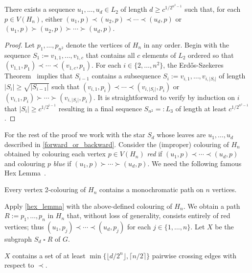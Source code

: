 \documentclass[kpfonts]{patmorin}
\renewcommand{\ge}{\geqslant}
\newcommand{\CartProd}{\mathbin{\square}}
\begin{document}
\begin{lem}\label{forward_or_backward}
    There exists a sequence $u_1,\ldots,u_{d}\in L_2$ of length $d\ge c^{1/2^{n^2-1}}$ such that, for each $p\in V(H_n)$, either  $(u_1,p)\prec (u_2,p)\prec\cdots\prec (u_{d},p)$ or $(u_1,p)\succ (u_2,p)\succ\cdots\succ (u_{d},p)$.
\end{lem}

\begin{proof}
    Let $p_1,\ldots,p_{n^2}$ denote the vertices of $H_n$ in any order.
    Begin with the sequence $S_1:=v_{1,1},\ldots,v_{1,c}$ that contains all $c$ elements of $L_2$ ordered so that $(v_{1,1},p_1)\prec\cdots\prec(v_{1,c},p_1)$.  For each $i\in\{2,\ldots,n^2\}$, the Erd\H{o}s-Szekeres Theorem~\citep{ES35} implies that $S_{i-1}$ contains a subsequence $S_i:=v_{i,1},\ldots,v_{i,|S_i|}$ of length $|S_i|\ge \sqrt{|S_{i-1}|}$ such that $(v_{i,1},p_i)\prec\cdots\prec(v_{i,|S_i|},p_i)$ or $(v_{i,1},p_i)\succ\cdots\succ(v_{i,|S_i|},p_i)$.  It is straightforward to verify by induction on $i$ that $|S_i| \ge c^{1/2^{i-1}}$ resulting in a final sequence $S_{n^2}=:L_3$ of length at least $c^{1/2^{n^2-1}}$.
\end{proof}


For the rest of the proof we work with the star $S_d$ whose leaves are $u_1,\ldots,u_d$ described in \cref{forward_or_backward}.  Consider the (improper) colouring of $H_n$ obtained by colouring each vertex $p\in V(H_n)$ \emph{red} if $(u_1,p)\prec\cdots\prec (u_d,p)$ and colouring $p$ \emph{blue} if $(u_1,p)\succ\cdots\succ(u_d,p)$. We need the following famous Hex Lemma~\citep{Gale79}.

\begin{lem} \label{hex_lemma}
Every vertex 2-colouring of $H_n$ contains a monochromatic path on $n$ vertices.
\end{lem}

Apply \cref{hex_lemma} with the above-defined colouring of $H_n$. We obtain a path $R:=p_1,\ldots,p_n$ in $H_n$ that, without loss of generality, consists entirely of red vertices;
thus $(u_1,p_j)\prec\cdots\prec (u_d,p_j)$ for each $j\in\{1,\ldots,n\}$.  Let $X$ be the subgraph $S_d \CartProd R$ of $G$.

\begin{lem}\label{twister}
$X$ contains a set of at least $\min\{\lfloor d/2^{n}\rfloor,\lceil n/2\rceil\}$ pairwise crossing edges with respect to $\prec$.
\end{lem}
\end{document}
